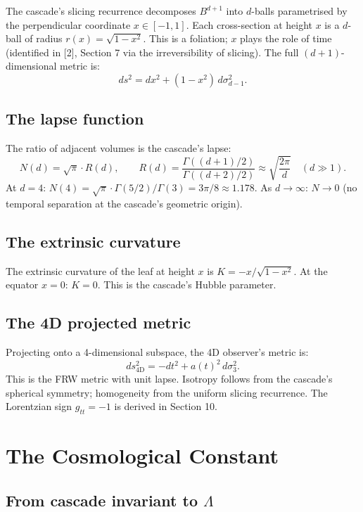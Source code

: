 \documentclass[12pt,a4paper]{article}
\begin{document}
The cascade's slicing recurrence decomposes $B^{d+1}$ into $d$-balls parametrised by the
perpendicular coordinate $x \in [-1, 1]$. Each cross-section at height $x$ is a $d$-ball of radius
$r(x) = \sqrt{1 - x^2}$. This is a foliation; $x$ plays the role of time (identified in [2], Section 7 via
the irreversibility of slicing). The full $(d + 1)$-dimensional metric is:
\[
ds^2 = dx^2 + (1 - x^2)\,d\sigma_{d-1}^2.
\]

\subsection{The lapse function}

The ratio of adjacent volumes is the cascade's lapse:
\[
N(d) = \sqrt{\pi} \cdot R(d), \qquad R(d) = \frac{\Gamma((d + 1)/2)}{\Gamma((d + 2)/2)} \approx \sqrt{\frac{2\pi}{d}} \quad (d \gg 1).
\]
At $d = 4$: $N(4) = \sqrt{\pi} \cdot \Gamma(5/2)/\Gamma(3) = 3\pi/8 \approx 1.178$. As $d \to \infty$: $N \to 0$ (no temporal
separation at the cascade's geometric origin).

\subsection{The extrinsic curvature}

The extrinsic curvature of the leaf at height $x$ is $K = -x/\sqrt{1 - x^2}$. At the equator $x = 0$:
$K = 0$. This is the cascade's Hubble parameter.

\subsection{The 4D projected metric}

Projecting onto a 4-dimensional subspace, the 4D observer's metric is:
\[
ds^2_{\text{4D}} = -dt^2 + a(t)^2\,d\sigma_3^2.
\]
This is the FRW metric with unit lapse. Isotropy follows from the cascade's spherical
symmetry; homogeneity from the uniform slicing recurrence. The Lorentzian sign $g_{tt} = -1$
is derived in Section 10.

\section{The Cosmological Constant}

\subsection{From cascade invariant to $\Lambda$}
\end{document}
